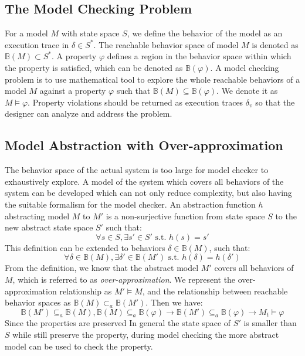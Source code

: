 
\subsection{The Model Checking Problem}
For a model $M$ with state space $S$, we define the behavior of the model as an execution trace in $\delta\in S^*$. The reachable behavior space of model $M$ is denoted as $\mathbb{B}(M)\subset S^*$. A property $\varphi$ defines a region in the behavior space within which the property is satisfied, which can be denoted as $\mathbb{B}(\varphi)$. A model checking problem is to use mathematical tool to explore the whole reachable behaviors of a model $M$ against a property $\varphi$ such that $\mathbb{B}(M)\subseteq \mathbb{B}(\varphi)$. We denote it as $M\models\varphi$. Property violations should be returned as execution traces $\delta_v$ so that the designer can analyze and address the problem. 

\subsection{Model Abstraction with Over-approximation}
The behavior space of the actual system is too large for model checker to exhaustively explore. A model of the system which covers all behaviors of the system can be developed which can not only reduce complexity, but also having the suitable formalism for the model checker. An abstraction function $h$ abstracting model $M$ to $M'$ is a non-surjective function from state space $S$ to the new abstract state space $S'$ such that: 
$$\forall s\in S, \exists s'\in S' \text{ s.t. } h(s)=s'$$
This definition can be extended to behaviors $\delta\in \mathbb{B}(M)$, such that:
$$\forall \delta\in \mathbb{B}(M),\exists \delta'\in\mathbb{B}(M')\text{ s.t. } h(\delta)=h(\delta')$$
From the definition, we know that the abstract model $M'$ covers all behaviors of $M$, which is referred to as \emph{over-approximation}. We represent the over-approximation relationship as $M'\models M$, and the relationship between reachable behavior spaces as $\mathbb{B}(M)\subset_a\mathbb{B}(M')$. Then we have:
$$\mathbb{B}(M')\subseteq_a \mathbb{B}(M),\mathbb{B}(M)\subseteq_a \mathbb{B}(\varphi)\rightarrow\mathbb{B}(M')\subseteq_a \mathbb{B}(\varphi)\rightarrow M_t\models\varphi$$
Since the properties are preserved In general the state space of $S'$ is smaller than $S$ while still preserve the property, during model checking the more abstract model can be used to check the property. 

